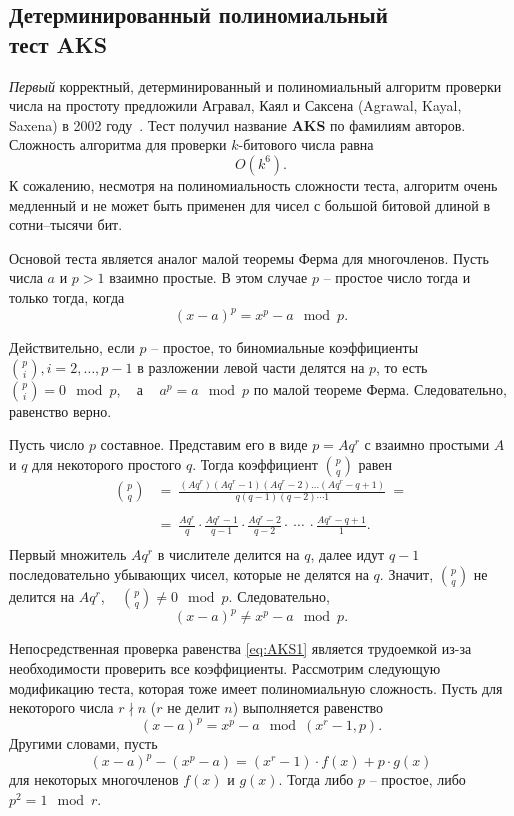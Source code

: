 \subsection[Детерминированный тест AKS]{Детерминированный полиномиальный \protect\\ тест AKS}

\emph{Первый} корректный, детерминированный и полиномиальный алгоритм проверки числа на простоту предложили Агравал, Каял и Саксена (Agrawal, Kayal, Saxena) в 2002 году~\cite{aks:2002}. Тест получил название \textbf{AKS} по фамилиям авторов. Сложность алгоритма для проверки $k$-битового числа равна
    \[ O(k^{6}). \]
К сожалению, несмотря на полиномиальность сложности теста, алгоритм очень медленный и не может быть применен для чисел с большой битовой длиной в сотни--тысячи бит.

Основой теста является аналог малой теоремы Ферма для многочленов. Пусть числа $a$ и $p > 1$  взаимно простые. В этом случае $p$ -- простое число тогда и только тогда, когда
\begin{equation}
    \label{eq:AKS1}
    (x - a)^p = x^p - a \mod p.
\end{equation}

Действительно, если $p$ -- простое, то биномиальные коэффициенты $\binom{p}{i}, i = 2,  \dots,  p-1$ в разложении левой части делятся на $p$, то есть ~ $\binom{p}{i} = 0 \mod p$, ~ а ~ $a^p = a \mod p$ по малой теореме Ферма. Следовательно, равенство верно.

Пусть число $p$  составное. Представим его в виде $p = A q^r$ с взаимно простыми $A$ и $q$ для некоторого простого $q$. Тогда коэффициент $\binom{p}{q}$ равен
\[\begin{array}{rl}
    \binom{p}{q} & =~ \frac{(A q^r) (A q^r - 1)(A q^r - 2) \dots (A q^r - q + 1)}{q (q-1)(q-2) \cdots 1} ~= \\
    & \\
    & =~ \frac{A q^r}{q} \cdot \frac{A q^r - 1}{q-1} \cdot \frac{A q^r - 2}{q-2} \cdot ~\cdots~ \cdot \frac{A q^r - q + 1}{1}. \\
\end{array} \]
Первый множитель $A q^r$ в числителе делится на $q$, далее идут $q-1$ последовательно убывающих чисел, которые не делятся на $q$. Значит, $\binom{p}{q}$ не делится на $A q^r$, ~ $\binom{p}{q} \neq 0 \mod p$. Следовательно,
\[
(x - a)^p \neq x^p - a \mod p.
\]

Непосредственная проверка равенства \eqref{eq:AKS1} является трудоемкой из-за необходимости проверить все коэффициенты. Рассмотрим следующую модификацию теста, которая тоже имеет полиномиальную сложность. Пусть для некоторого числа $r \nmid n$ ($r$ не делит $n$) выполняется равенство
\begin{equation}
    \label{eq:AKS2}
    (x - a)^p = x^p - a \mod (x^r-1, p).
\end{equation}
Другими словами, пусть
    \[ (x - a)^p - (x^p - a) = (x^r-1) \cdot f(x) + p \cdot g(x) \]
для некоторых многочленов $f(x)$ и $g(x)$. Тогда либо $p$ -- простое, либо $p^2 = 1 \mod r$.

